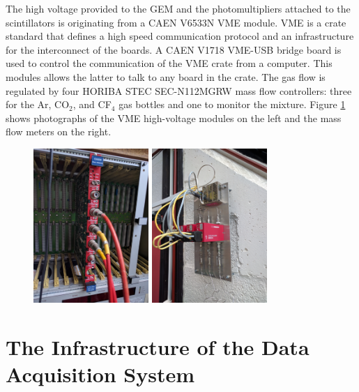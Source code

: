       The high voltage provided to the GEM and the photomultipliers attached to the scintillators is originating from a CAEN V6533N VME module. VME is a crate standard that defines a high speed communication protocol and an infrastructure for the interconnect of the boards. A CAEN V1718 VME-USB bridge board is used to control the communication of the VME crate from a computer. This modules allows the latter to talk to any board in the crate. The gas flow is regulated by four HORIBA STEC SEC-N112MGRW mass flow controllers: three for the Ar, CO$_2$, and CF$_4$ gas bottles and one to monitor the mixture. Figure \ref{fig:III-1-gas-hv} shows photographs of the VME high-voltage modules on the left and the mass flow meters on the right. 

      \begin{figure}[h!]
        \centering
        \includegraphics[width=0.39\textwidth]{img/III-1-arch/hv.jpg}
        \includegraphics[width=0.39\textwidth]{img/III-1-arch/gas.jpg}
        \caption{}
        \label{fig:III-1-gas-hv}
      \end{figure}


  \section{The Infrastructure of the Data Acquisition System}

